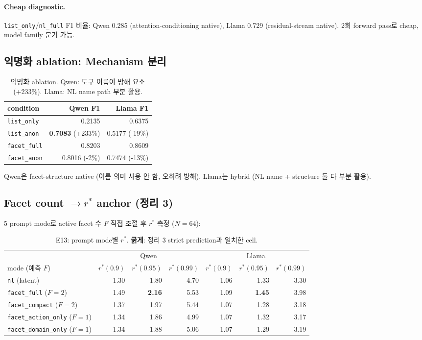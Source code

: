 \documentclass[11pt]{article}
\theoremstyle{definition}
\begin{document}
\paragraph{Cheap diagnostic.}
\texttt{list\_only}/\texttt{nl\_full} F1 비율: Qwen 0.285 (attention-conditioning native), Llama 0.729 (residual-stream native). 2회 forward pass로 cheap, model family 분기 가능.

\subsection{익명화 ablation: Mechanism 분리}
\label{sec:exp-anon}

\begin{table}[h]
\centering
\caption{익명화 ablation. Qwen: 도구 이름이 방해 요소 (+233\%). Llama: NL name path 부분 활용.}
\label{tab:anon}
\small
\begin{tabular}{lrr}
\toprule
condition & Qwen F1 & Llama F1 \\
\midrule
\texttt{list\_only}  & 0.2135 & 0.6375 \\
\texttt{list\_anon}  & \textbf{0.7083} (+233\%) & 0.5177 (-19\%) \\
\texttt{facet\_full} & 0.8203 & 0.8609 \\
\texttt{facet\_anon} & 0.8016 (-2\%) & 0.7474 (-13\%) \\
\bottomrule
\end{tabular}
\end{table}

Qwen은 facet-structure native (이름 의미 사용 안 함, 오히려 방해), Llama는 hybrid (NL name + structure 둘 다 부분 활용).

\subsection{Facet count $\to r^*$ anchor (정리 3)}
\label{sec:exp-facet-rank}

5 prompt mode로 active facet 수 $F$ 직접 조절 후 $r^*$ 측정 ($N=64$):

\begin{table}[h]
\centering
\caption{E13: prompt mode별 $r^*$. \textbf{굵게}: 정리 3 strict prediction과 일치한 cell.}
\label{tab:e13}
\small
\begin{tabular}{l|rrr|rrr}
\toprule
& \multicolumn{3}{c|}{Qwen} & \multicolumn{3}{c}{Llama} \\
mode (예측 $F$) & $r^*(0.9)$ & $r^*(0.95)$ & $r^*(0.99)$ & $r^*(0.9)$ & $r^*(0.95)$ & $r^*(0.99)$ \\
\midrule
\texttt{nl} (latent)              & 1.30 & 1.80 & 4.70 & 1.06 & 1.33 & 3.30 \\
\texttt{facet\_full} ($F{=}2$)    & 1.49 & \textbf{2.16} & 5.53 & 1.09 & \textbf{1.45} & 3.98 \\
\texttt{facet\_compact} ($F{=}2$) & 1.37 & 1.97 & 5.44 & 1.07 & 1.28 & 3.18 \\
\texttt{facet\_action\_only} ($F{=}1$) & 1.34 & 1.86 & 4.99 & 1.07 & 1.32 & 3.17 \\
\texttt{facet\_domain\_only} ($F{=}1$) & 1.34 & 1.88 & 5.06 & 1.07 & 1.29 & 3.19 \\
\bottomrule
\end{tabular}
\end{table}
\end{document}
